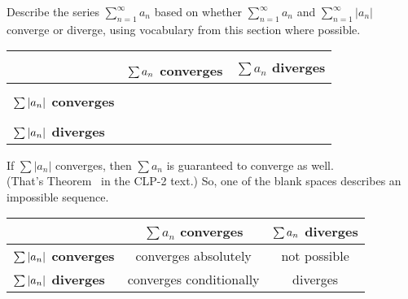 \begin{Mquestion}
Describe the series $\displaystyle\sum_{n=1}^\infty a_n$ based on whether
$\displaystyle\sum_{n=1}^\infty a_n$ and $\displaystyle\sum_{n=1}^\infty |a_n|$ converge or diverge, using vocabulary from this section where possible.
\begin{center}
\begin{tabular}{|l|c|c|}
\hline
& \textbf{$\sum\limits^{\vphantom{{\frac12}}}  a_n$ converges} & \textbf{$\sum a_n$ diverges}\\[10pt]
\hline
 \textbf{$\sum\limits^{\vphantom{{\frac12}}}  |a_n|$ converges}&&\\[10pt]
 \hline
  \textbf{$\sum\limits^{\vphantom{{\frac12}}}  |a_n|$ diverges}&&\\[10pt]
  \hline
\end{tabular}
\end{center}

\end{Mquestion}
\begin{hint}
If $\sum |a_n|$ converges, then $\sum a_n$ is guaranteed to converge as well. \\
(That's Theorem~ in the CLP-2 text.) So, one of the blank spaces describes an impossible sequence.
\end{hint}
\begin{answer}
\begin{center}
\begin{tabular}{|l|c|c|}
\hline
& \textbf{$\sum a_n$ converges} & \textbf{$\sum\vphantom{^{\frac12}} a_n$ diverges}\\[10pt]
\hline
 \textbf{$\sum\vphantom{^{\frac12}}  |a_n|$ converges}&converges absolutely&not possible\\[10pt]
 \hline
  \textbf{$\sum\vphantom{^{\frac12}}  |a_n|$ diverges}&converges conditionally&diverges\\[10pt]
  \hline
\end{tabular}
\end{center}
\end{answer}
